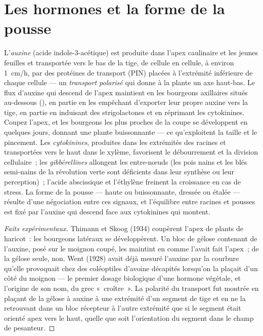 \section{Les hormones et la forme de la pousse}

\begin{proposition}\label{prop:b2:plant-meristems:apical}
L'\emph{auxine} (acide indole-3-acétique) est produite dans l'apex
caulinaire et les jeunes feuilles et transportée vers le bas de la
tige, de cellule en cellule, à environ \qty{1}{cm/h}, par des protéines
de transport (PIN) placées à l'extrémité inférieure de chaque cellule
--- un \emph{transport polarisé} qui donne à la plante un axe
haut-bas. Le flux d'auxine qui descend de l'apex maintient en 
les bourgeons axillaires situés au-dessous (\emph{}),
en partie en les empêchant d'exporter leur propre auxine vers la tige,
en partie en induisant des strigolactones et en réprimant les
cytokinines. Coupez l'apex, et les bourgeons les plus proches de la
coupe se développent en quelques jours, donnant une plante buissonnante
--- ce qu'exploitent la taille et le pincement. Les \emph{cytokinines},
produites dans les extrémités des racines et transportées vers le haut
dans le xylème, favorisent le débourrement et la division cellulaire~;
les \emph{gibbérellines} allongent les entre-nœuds (les pois nains et
les blés semi-nains de la révolution verte sont déficients dans leur
synthèse ou leur perception)~; l'acide abscissique et l'éthylène freinent
la croissance en cas de stress. La forme de la pousse --- haute ou
buissonnante, dressée ou étalée --- résulte d'une négociation entre ces
signaux, et l'équilibre entre racines et pousses est fixé par l'auxine
qui descend face aux cytokinines qui montent.
\end{proposition}
\begin{proof}[Faits expérimentaux]
Thimann et Skoog (1934) coupèrent l'apex de plants de haricot~: les
bourgeons latéraux se développèrent. Un bloc de gélose contenant de
l'auxine, posé sur le moignon coupé, les maintint en  comme
l'avait fait l'apex~; de la gélose seule, non. Went (1928) avait déjà
mesuré l'auxine par la courbure qu'elle provoquait chez des coléoptiles
d'avoine décapités lorsqu'on la plaçait d'un côté du moignon --- le
premier dosage biologique d'une hormone végétale, et l'origine de son
nom, du grec «~croître~». La polarité du transport fut montrée en
plaçant de la gélose à auxine à une extrémité d'un segment de tige et en
ne la retrouvant dans un bloc récepteur à l'autre extrémité que si le
segment était orienté apex vers le haut, quelle que soit l'orientation
du segment dans le champ de pesanteur.
\end{proof}


